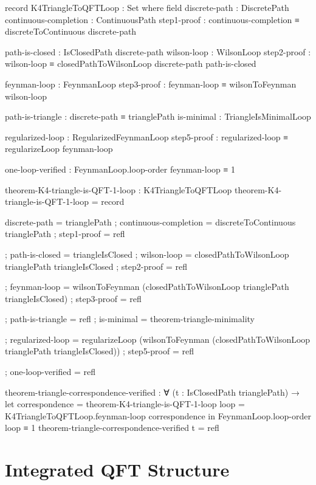 \documentclass[11pt,a4paper]{book}
\begin{document}
\begin{code}
record K4TriangleToQFTLoop : Set where
  field
    discrete-path : DiscretePath
    continuous-completion : ContinuousPath
    step1-proof : continuous-completion ≡ discreteToContinuous discrete-path
    
    path-is-closed : IsClosedPath discrete-path
    wilson-loop : WilsonLoop
    step2-proof : wilson-loop ≡ closedPathToWilsonLoop discrete-path path-is-closed
    
    feynman-loop : FeynmanLoop
    step3-proof : feynman-loop ≡ wilsonToFeynman wilson-loop
    
    path-is-triangle : discrete-path ≡ trianglePath
    is-minimal : TriangleIsMinimalLoop
    
    regularized-loop : RegularizedFeynmanLoop
    step5-proof : regularized-loop ≡ regularizeLoop feynman-loop
    
    one-loop-verified : FeynmanLoop.loop-order feynman-loop ≡ 1

theorem-K4-triangle-is-QFT-1-loop : K4TriangleToQFTLoop
theorem-K4-triangle-is-QFT-1-loop = record
  { discrete-path = trianglePath
  ; continuous-completion = discreteToContinuous trianglePath
  ; step1-proof = refl
  
  ; path-is-closed = triangleIsClosed
  ; wilson-loop = closedPathToWilsonLoop trianglePath triangleIsClosed
  ; step2-proof = refl
  
  ; feynman-loop = wilsonToFeynman (closedPathToWilsonLoop trianglePath triangleIsClosed)
  ; step3-proof = refl
  
  ; path-is-triangle = refl
  ; is-minimal = theorem-triangle-minimality
  
  ; regularized-loop = regularizeLoop (wilsonToFeynman (closedPathToWilsonLoop trianglePath triangleIsClosed))
  ; step5-proof = refl
  
  ; one-loop-verified = refl
  }

theorem-triangle-correspondence-verified : 
  ∀ (t : IsClosedPath trianglePath) →
  let correspondence = theorem-K4-triangle-is-QFT-1-loop
      loop = K4TriangleToQFTLoop.feynman-loop correspondence
  in FeynmanLoop.loop-order loop ≡ 1
theorem-triangle-correspondence-verified t = refl

\end{code}

\section{Integrated QFT Structure}
\end{document}
